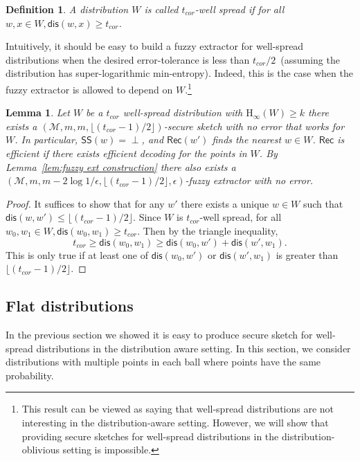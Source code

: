 \documentclass[11pt]{article}
\newcommand{\lemref}[1]{\mbox{Lemma~\ref{#1}}}
\newcommand{\class}[1]{{\ensuremath{\mathsf{#1}}}}
\newcommand{\sketch}{\ensuremath{\class{SS}}\xspace}
\newcommand{\rec}{\ensuremath{\class{Rec}}\xspace}
\newcommand{\dis}{\ensuremath{\mathsf{dis}}}
\newcommand{\Hoo}{\mathrm{H}_\infty}
\newtheorem{lemma}[theorem]{Lemma}
\newtheorem{definition}[theorem]{Definition}
\begin{document}
\begin{definition}
A distribution $W$ is called \emph{$t_{cor}$-well spread} if for all $w, x\in W, \dis(w, x)\ge t_{cor}$.
\end{definition}
Intuitively, it should be easy to build a fuzzy extractor for well-spread distributions when the desired error-tolerance is less than $t_{cor}/2$~(assuming the distribution has super-logarithmic min-entropy).  Indeed, this is the case when the fuzzy extractor is allowed to depend on $W$.\footnote{This result can be viewed as saying that well-spread distributions are not interesting in the distribution-aware setting.  However, we will show that providing secure sketches for well-spread distributions in the distribution-oblivious setting is impossible.}

\begin{lemma}
\label{lem:nosketchwellspread}
Let $W$ be a $t_{cor}$ well-spread distribution with $\Hoo(W)\ge k$ there exists a $(\mathcal{M}, m, m, \lfloor( t_{cor}-1)/2\rfloor)$-secure sketch with no error that works for $W$.  In particular, $\sketch(w) = \perp$, and $\rec(w')$ finds the nearest $w\in W$.  \rec is efficient if there exists efficient decoding for the points in $W$.  By \lemref{lem:fuzzy ext construction} there also exists a $(\mathcal{M}, m,m -2\log 1/\epsilon, \lfloor (t_{cor}-1)/2\rfloor, \epsilon)$-fuzzy extractor with no error.
\end{lemma}  
\begin{proof}
It suffices to show that for any $w'$ there exists a unique $w\in W$ such that $\dis (w, w')\le \lfloor (t_{cor}-1)/2\rfloor$.  Since $W$ is $t_{cor}$-well spread, for all $w_0, w_1 \in W, \dis (w_0, w_1)\ge t_{cor}$.  Then by the triangle inequality,
\[
t_{cor}\ge \dis(w_0, w_1) \ge \dis(w_0, w') + \dis(w', w_1).\]
This is only true if at least one of $\dis(w_0, w')$ or $\dis(w', w_1)$ is greater than $\lfloor (t_{cor}-1)/2\rfloor$.
\end{proof}

\subsection{Flat distributions}
In the previous section we showed it is easy to produce secure sketch for well-spread distributions in the distribution aware setting.
In this section, we consider distributions with multiple points in each ball where points have the same probability.
\end{document}
